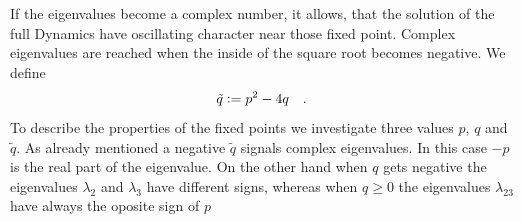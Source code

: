 \documentclass{article}
\begin{document}
If the eigenvalues become a complex number, it allows, that the solution of the full Dynamics have oscillating character near those fixed point. Complex eigenvalues are reached when the inside of the square root becomes negative. We define
\begin{align*}
    \tilde{q}\vcentcolon=p^2-4q\quad.
\end{align*}
To describe the properties of the fixed points we investigate three values $p$, $q$ and $\tilde{q}$. As already mentioned a negative $\tilde{q}$ signals complex eigenvalues. In this case $-p$ is the real part of the eigenvalue. On the other hand when $q$ gets negative the eigenvalues $\lambda_2$ and $\lambda_3$ have different signs, whereas when $q\geq0$ the eigenvalues $\lambda_{23}$ have always the oposite sign of $p$
\end{document}
